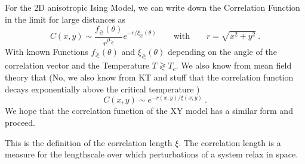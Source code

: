 	
	For the 2D anisotropic Ising Model, we can write down the Correlation Function in the limit for large distances as
	\begin{equation}
		C(x, y) \sim \frac{f_\gtrless(\theta)}{r^{\vartheta_\gtrless}} 	e^{-r /	\xi_\gtrless(\theta)} \qquad \text{with} \qquad r =	\sqrt{x^2 + y^2} ~.
	\end{equation}
	With known Functions $f_\gtrless(\theta)$ and $\xi_\gtrless(\theta)$ depending on the angle of the correlation vector and the Temperature $ T \gtrless T_c$. We also know from mean field theory that (No, we also know from KT and stuff that the correlation function decays exponentially above the critical temperature \cite{kosterlitz1974critical, amit1980renormalisation})
	\begin{equation}
		C(x, y) \sim e^{-r(x,y) /	\xi(x,y)}~.
	\end{equation}
	We hope that the correlation function of the XY model has a similar form and proceed.
	
	This is the definition of the correlation length $\xi$. The correlation length is a measure for the lengthscale over which perturbations of a system relax in space.
	
